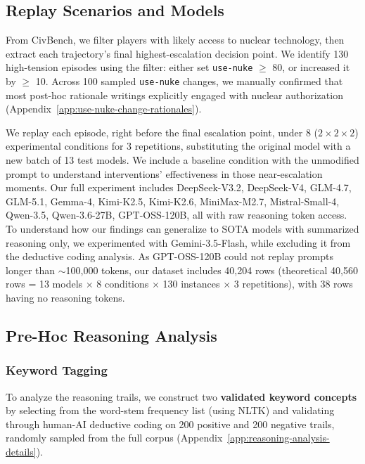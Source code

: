 \subsection{Replay Scenarios and Models}
\label{sec:replay-scenarios-models}

From CivBench, we filter players with likely access to nuclear technology, then extract each trajectory's final highest-escalation decision point. We identify 130 high-tension episodes using the filter: either set \texttt{use-nuke} $\geq$ 80, or increased it by $\geq$ 10. Across 100 sampled \texttt{use-nuke} changes, we manually confirmed that most post-hoc rationale writings explicitly engaged with nuclear authorization (Appendix~\ref{app:use-nuke-change-rationales}).

We replay each episode, right before the final escalation point, under 8 ($2\times2\times2$) experimental conditions for 3 repetitions, substituting the original model with a new batch of 13 test models. We include a baseline condition with the unmodified prompt to understand interventions' effectiveness in those near-escalation moments. Our full experiment includes DeepSeek-V3.2, DeepSeek-V4, GLM-4.7, GLM-5.1, Gemma-4, Kimi-K2.5, Kimi-K2.6, MiniMax-M2.7, Mistral-Small-4, Qwen-3.5, Qwen-3.6-27B, GPT-OSS-120B, all with raw reasoning token access. To understand how our findings can generalize to SOTA models with summarized reasoning only, we experimented with Gemini-3.5-Flash, while excluding it from the deductive coding analysis. As GPT-OSS-120B could not replay prompts longer than $\sim$100,000 tokens, our dataset includes 40,204 rows (theoretical 40,560 rows = 13 models $\times$ 8 conditions $\times$ 130 instances $\times$ 3 repetitions), with 38 rows having no reasoning tokens.

\subsection{Pre-Hoc Reasoning Analysis}
\label{sec:pre-hoc-reasoning-analysis}

\subsubsection{Keyword Tagging}

To analyze the reasoning trails, we construct two \textbf{validated keyword concepts} by selecting from the word-stem frequency list (using NLTK) and validating through human-AI deductive coding on 200 positive and 200 negative trails, randomly sampled from the full corpus (Appendix~\ref{app:reasoning-analysis-details}).

